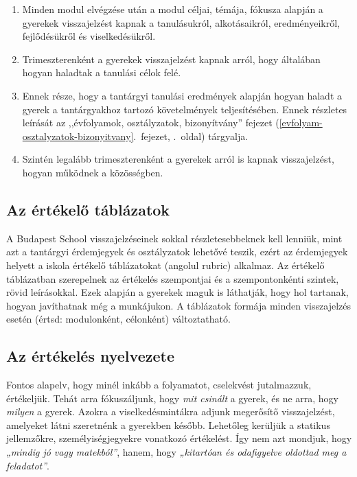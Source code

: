\begin{enumerate}
\def\labelenumi{\arabic{enumi}.}
\tightlist
\item
  Minden modul elvégzése után a modul céljai, témája, fókusza alapján a
  gyerekek visszajelzést kapnak a tanulásukról, alkotásaikról,
  eredményeikről, fejlődésükről és viselkedésükről.
\item
  Trimeszterenként a gyerekek visszajelzést kapnak arról, hogy
  általában hogyan haladtak a tanulási célok felé.
\item
  Ennek része, hogy a tantárgyi tanulási eredmények alapján hogyan
  haladt a gyerek a tantárgyakhoz tartozó követelmények teljesítésében.
  Ennek részletes leírását az
  ,,évfolyamok, osztályzatok, bizonyítvány'' fejezet (\ref{evfolyam-osztalyzatok-bizonyitvany}.~fejezet, \pageref{evfolyam-osztalyzatok-bizonyitvany}.~oldal) tárgyalja.
\item
  Szintén legalább trimeszterenként a gyerekek arról is kapnak
  visszajelzést, hogyan működnek a közösségben.
\end{enumerate}

\hypertarget{az-ertekelo-tablazatok}{%
\subsection{Az értékelő táblázatok}\label{az-ertekelo-tablazatok}}

A Budapest School visszajelzéseinek sokkal részletesebbeknek kell
lenniük, mint azt a tantárgyi érdemjegyek és osztályzatok lehetővé
teszik, ezért az érdemjegyek helyett a iskola értékelő táblázatokat
(angolul rubric) alkalmaz. Az értékelő táblázatban szerepelnek az
értékelés szempontjai és a szempontonkénti szintek, rövid leírásokkal.
Ezek alapján a gyerekek maguk is láthatják, hogy hol tartanak, hogyan
javíthatnak még a munkájukon. A táblázatok formája minden visszajelzés
esetén (értsd: modulonként, célonként) változtatható.

\hypertarget{ertekeles-nyelvezete}{%
\subsection{Az értékelés nyelvezete}\label{ertekeles-nyelvezete}}

Fontos alapelv, hogy minél inkább a folyamatot, cselekvést jutalmazzuk,
értékeljük. Tehát arra fókuszáljunk, hogy \emph{mit csinált} a gyerek,
és ne arra, hogy \emph{milyen} a gyerek. Azokra a viselkedésmintákra
adjunk megerősítő visszajelzést, amelyeket látni szeretnénk a gyerekben
később. Lehetőleg kerüljük a statikus jellemzőkre, személyiségjegyekre
vonatkozó értékelést. Így nem azt mondjuk, hogy \emph{„mindig jó vagy
matekból''}, hanem, hogy \emph{„kitartóan és odafigyelve oldottad meg a
feladatot''}.

